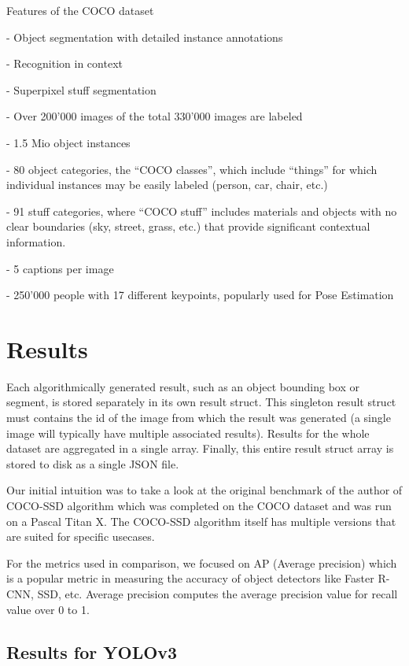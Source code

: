 \documentclass[runningheads,a4paper,11pt]{report}
\begin{document}
Features of the COCO dataset

    - Object segmentation with detailed instance annotations
    
    - Recognition in context
    
    - Superpixel stuff segmentation
    
    - Over 200’000 images of the total 330’000 images are labeled
    
    - 1.5 Mio object instances
    
    - 80 object categories, the “COCO classes”, which include “things” for which individual instances may be easily labeled (person, car, chair, etc.)
    
    - 91 stuff categories, where “COCO stuff” includes materials and objects with no clear boundaries (sky, street, grass, etc.) that provide significant contextual information.
    
    - 5 captions per image
    
    - 250’000 people with 17 different keypoints, popularly used for Pose Estimation




\section{Results}
\label{section:results}

Each algorithmically generated result, such as an object bounding box or segment, is stored separately in its own result struct. This singleton result struct must contains the id of the image from which the result was generated (a single image will typically have multiple associated results). Results for the whole dataset are aggregated in a single array. Finally, this entire result struct array is stored to disk as a single JSON file.

Our initial intuition was to take a look at the original benchmark of the author of COCO-SSD algorithm which was completed on the COCO dataset and was run on a Pascal Titan X. The COCO-SSD algorithm itself has multiple versions that are suited for specific usecases.

For the metrics used in comparison, we focused on AP (Average precision) which is a popular metric in measuring the accuracy of object detectors like Faster R-CNN, SSD, etc. Average precision computes the average precision value for recall value over 0 to 1. 

\subsection{Results for YOLOv3}
\label{subsection:results}
\end{document}

